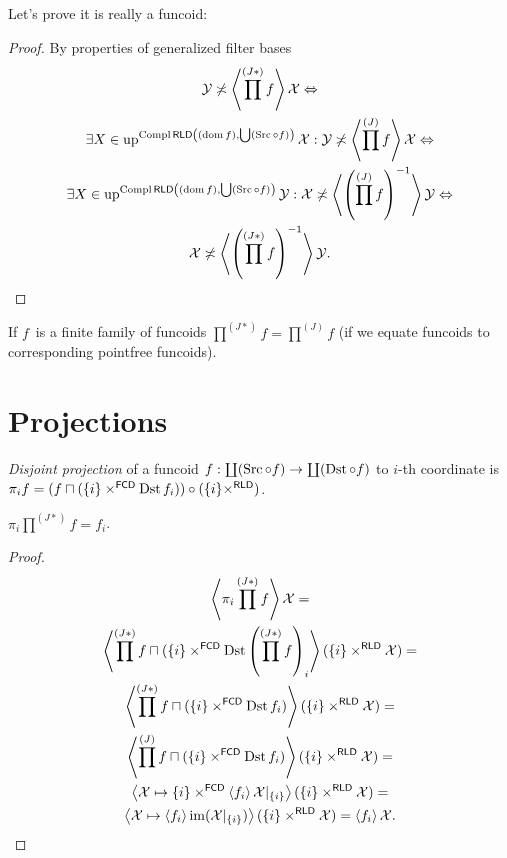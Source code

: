 Let's prove it is really a funcoid:

\begin{proof}
By properties of generalized filter bases
\begin{multline*}
\mathcal{Y}\not\asymp\left\langle \prod^{(J\ast)} f\right\rangle\mathcal{X}
\Leftrightarrow\\
\exists X\in\operatorname{up}^{\operatorname{Compl}\mathsf{RLD}\left((\operatorname{dom} f),\bigcup(\operatorname{Src}\circ f)\right)}\mathcal{X}:
\mathcal{Y}\not\asymp\left\langle \prod^{(J)}f\right\rangle\mathcal{X}
\Leftrightarrow\\
\exists X\in\operatorname{up}^{\operatorname{Compl}\mathsf{RLD}\left((\operatorname{dom} f),\bigcup(\operatorname{Src}\circ f)\right)}\mathcal{Y}:
\mathcal{X}\not\asymp\left\langle \left(\prod^{(J)}f\right)^{-1}\right\rangle\mathcal{Y}
\Leftrightarrow\\
\mathcal{X}\not\asymp
\left\langle \left(\prod^{(J\ast)} f\right)^{-1}\right\rangle\mathcal{Y}.
\end{multline*}
\end{proof}

\begin{obvious}
If $f$~is a finite family of funcoids $\prod^{(J\ast)}f=\prod^{(J)}f$ (if we equate funcoids to corresponding pointfree funcoids).
\end{obvious}

\section{Projections}

\begin{defn}
\emph{Disjoint projection} of a funcoid $f: \coprod(\operatorname{Src}\circ f)\to\coprod(\operatorname{Dst}\circ f)$ to $i$-th coordinate is
$\pi_i f=
(f\sqcap(\{i\}\times^{\mathsf{FCD}}\operatorname{Dst} f_i))\circ
(\{i\}\times^{\mathsf{RLD}})$.
\end{defn}

\begin{thm}
$\pi_i\prod^{(J\ast)}f=f_i$.
\end{thm}

\begin{proof}
\begin{multline*}
\left\langle \pi_i\prod^{(J\ast)}f\right\rangle\mathcal{X} =\\
\left\langle \prod^{(J\ast)}f\sqcap(\{i\}\times^{\mathsf{FCD}}\operatorname{Dst} \left(\prod^{(J\ast)}f\right)_i\right\rangle(\{i\}\times^{\mathsf{RLD}}\mathcal{X})=\\
\left\langle \prod^{(J\ast)}f\sqcap(\{i\}\times^{\mathsf{FCD}}\operatorname{Dst} f_i)\right\rangle(\{i\}\times^{\mathsf{RLD}}\mathcal{X})=\\
\left\langle \prod^{(J)}f\sqcap(\{i\}\times^{\mathsf{FCD}}\operatorname{Dst} f_i)\right\rangle(\{i\}\times^{\mathsf{RLD}}\mathcal{X})=\\
\left\langle \mathcal{X}\mapsto\{i\}\times^{\mathsf{FCD}}\left\langle f_i\right\rangle\mathcal{X}|_{\{i\}}\right\rangle(\{i\}\times^{\mathsf{RLD}}\mathcal{X})=\\
\left\langle \mathcal{X}\mapsto\left\langle f_i\right\rangle\operatorname{im}(\mathcal{X}|_{\{i\}})\right\rangle(\{i\}\times^{\mathsf{RLD}}\mathcal{X})
=\left\langle f_i\right\rangle\mathcal{X}.
\end{multline*}
\end{proof}